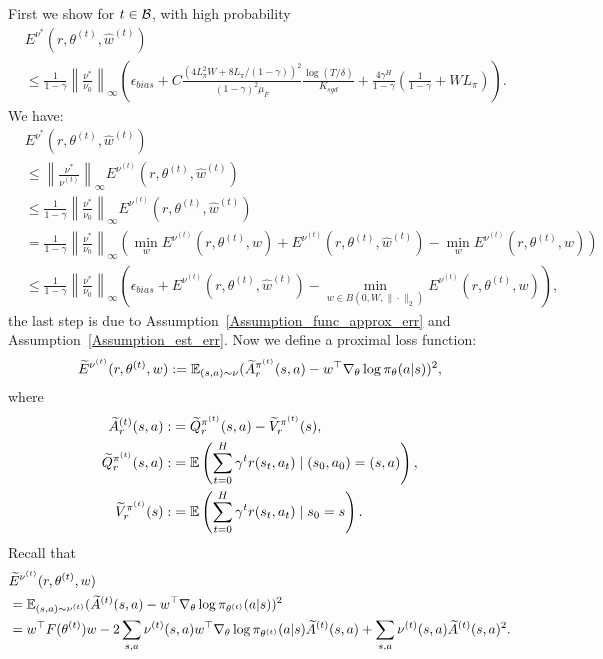 First we show for $t\in{\mathcal{B}}$, with high probability
$$
\begin{aligned}
    &E^{\nu^*}(r,\theta^{(t)}, \hat w^{(t)})\\
    &\leq \frac{1}{1-\gamma}\left\|\frac{\nu^*}{\nu_0}\right\|_\infty\left(\epsilon_{bias}+C\frac{(4L_\pi^2W+8L_\pi/(1-\gamma))^2}{(1-\gamma)^2\mu_F}\frac{\log(T/\delta)}{K_{sgd}}+\frac{4\gamma^H}{1-\gamma}\left(\frac{1}{1-\gamma}+WL_\pi\right)\right).
\end{aligned}
$$
We have:
$$
\begin{aligned}
&E^{\nu^*}(r,\theta^{(t)}, \hat w^{(t)})\\
&\leq \left\|\frac{\nu^{*}}{\nu^{(t)}}\right\|_{\infty} E^{\nu^{(t)}}(r,\theta^{(t)}, \hat w^{(t)})\\
&\leq \frac{1}{1-\gamma} \left\|\frac{\nu^{*}}{\nu_{0}}\right\|_{\infty} E^{\nu^{(t)}}(r,\theta^{(t)}, \hat w^{(t)})\\
&=\frac{1}{1-\gamma}\left\|\frac{\nu^{*}}{\nu_{0}}\right\|_{\infty}\left( \min_w E^{\nu^{(t)}}(r,\theta^{(t)},w)+E^{\nu^{(t)}}\left(r,\theta^{(t)}, \hat w^{(t)}\right)-\min_w E^{\nu^{(t)}}(r,\theta^{(t)},w)\right)\\
&\leq \frac{1}{1-\gamma}\left\|\frac{\nu^{*}}{\nu_{0}}\right\|_{\infty}\left(\epsilon_{bias}+E^{\nu^{(t)}}\left(r, \theta^{(t)}, \hat w^{(t)}\right)-\min_{w\in B(0,W,\|\cdot\|_2)} E^{\nu^{(t)}}(r,\theta^{(t)},w)\right),
\end{aligned}
$$
the last step is due to Assumption~\ref{Assumption_func_approx_err} and Assumption~\ref{Assumption_est_err}.
Now we define a proximal loss function:
$$
\widetilde{E}^{\nu^{(t)}}(r,\theta^{(t)},w):={\mathbb E}_{(s,a)\sim\nu}(\widetilde{A}^{\pi^{(t)}}_r(s,a)-w^\top\nabla_\theta\log\pi_\theta(a|s))^2,
$$
where
$$
\begin{aligned}
    \widetilde{A}^{(t)}_r(s,a):&=\widetilde{Q}^{\pi^{(t)}}_r(s,a)-\widetilde{V}^{\pi^{(t)}}_r(s),\\
    \widetilde{Q}^{\pi^{(t)}}_r(s,a):&={\mathbb E}\left(\sum_{t=0}^H\gamma^t r(s_t,a_t)\mid (s_0,a_0)=(s,a)\right),\\
    \widetilde{V}^{\pi^{(t)}}_r(s):&={\mathbb E}\left(\sum_{t=0}^H\gamma^t r(s_t,a_t)\mid s_0=s\right).\\
\end{aligned}
$$
Recall that
$$
\begin{aligned}
&\widetilde{E}^{\nu^{(t)}}(r,\theta^{(t)},w)\\
&={\mathbb E}_{(s,a)\sim\nu^{(t)}}(\widetilde{A}^{(t)}(s,a)-w^\top\nabla_\theta\log\pi_{\theta^{(t)}}(a|s))^2\\    &=w^\top F(\theta^{(t)})w-2\sum_{s,a}\nu^{(t)}(s,a)w^\top \nabla_\theta\log\pi_{\theta^{(t)}}(a|s)\widetilde{A}^{(t)}(s,a)+\sum_{s,a}\nu^{(t)}(s,a)\widetilde{A}^{(t)}(s,a)^2.
\end{aligned}
$$
